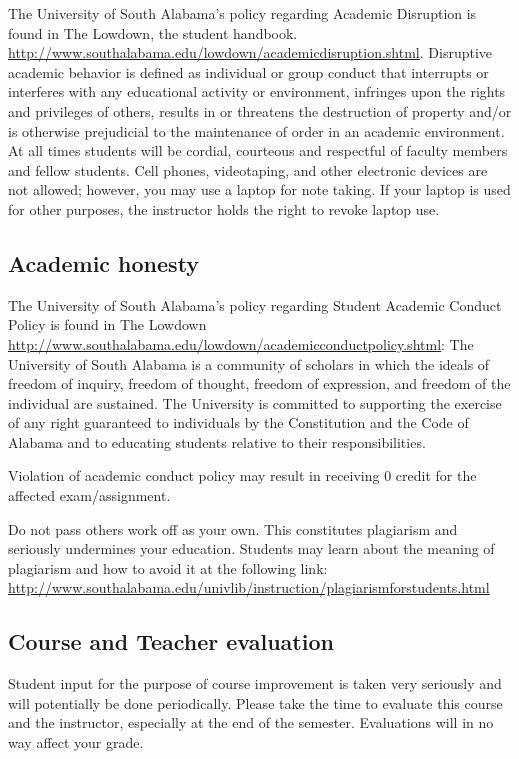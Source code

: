 \documentclass[11pt,]{article}
\begin{document}
The University of South Alabama's policy regarding Academic Disruption
is found in The Lowdown, the student handbook.
\url{http://www.southalabama.edu/lowdown/academicdisruption.shtml}.
Disruptive academic behavior is defined as individual or group conduct
that interrupts or interferes with any educational activity or
environment, infringes upon the rights and privileges of others, results
in or threatens the destruction of property and/or is otherwise
prejudicial to the maintenance of order in an academic environment. At
all times students will be cordial, courteous and respectful of faculty
members and fellow students. Cell phones, videotaping, and other
electronic devices are not allowed; however, you may use a laptop for
note taking. If your laptop is used for other purposes, the instructor
holds the right to revoke laptop use.

\hypertarget{academic-honesty}{%
\subsection{Academic honesty}\label{academic-honesty}}

The University of South Alabama's policy regarding Student Academic
Conduct Policy is found in The Lowdown
\url{http://www.southalabama.edu/lowdown/academicconductpolicy.shtml}:
The University of South Alabama is a community of scholars in which the
ideals of freedom of inquiry, freedom of thought, freedom of expression,
and freedom of the individual are sustained. The University is committed
to supporting the exercise of any right guaranteed to individuals by the
Constitution and the Code of Alabama and to educating students relative
to their responsibilities.

Violation of academic conduct policy may result in receiving 0 credit
for the affected exam/assignment.

Do not pass others work off as your own. This constitutes plagiarism and
seriously undermines your education. Students may learn about the
meaning of plagiarism and how to avoid it at the following link:
\url{http://www.southalabama.edu/univlib/instruction/plagiarismforstudents.html}

\hypertarget{course-and-teacher-evaluation}{%
\subsection{Course and Teacher
evaluation}\label{course-and-teacher-evaluation}}

Student input for the purpose of course improvement is taken very
seriously and will potentially be done periodically. Please take the
time to evaluate this course and the instructor, especially at the end
of the semester. Evaluations will in no way affect your grade.
\end{document}
